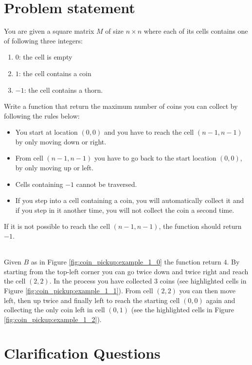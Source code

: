 \section{Problem statement}
\begin{exercise}
\label{example:coin_pickup:exercice1}
You are given a square matrix $M$ of size $n \times n$ where each of its cells contains one of following three integers:
\begin{enumerate}
	\item $0$: the cell is empty
	\item $1$: the cell contains a coin
	\item $-1$: the cell contains a thorn. 
\end{enumerate}
Write a function that return the maximum number of coins you can collect by following the rules below:
\begin{itemize}
	\item You start at location $(0,0)$ and you have to reach the cell $(n-1,n-1)$ by only moving down or right.
	\item From cell  $(n-1,n-1)$ you have to go back to the start location $(0,0)$, by only moving up or left.
	\item Cells containing $-1$ cannot be traversed.
	\item If you step into a cell containing a coin, you will automatically collect it and if you step in it another time, you will not collect the coin a second time.
\end{itemize}
If it is not possible to reach the cell $(n-1,n-1)$, the function should return $-1$.

	\begin{example}
		\label{example:coin_pickup:example1}
		\hfill \\
		Given $B$  as in Figure \ref{fig:coin_pickup:example_1_0} the function return $4$.
		By starting from the top-left corner you can go twice down and twice right and reach the cell $(2,2)$. In the process
		you have collected $3$ coins (see highlighted cells in Figure \ref{fig:coin_pickup:example_1_1}).
		From cell $(2,2)$ you can then move left, then up twice and finally left to reach the starting cell $(0,0)$ again
		 and collecting the only coin left in cell $(0,1)$ (see the highlighted cells in Figure \ref{fig:coin_pickup:example_1_2}). 
	\end{example}

\end{exercise}

\section{Clarification Questions}

